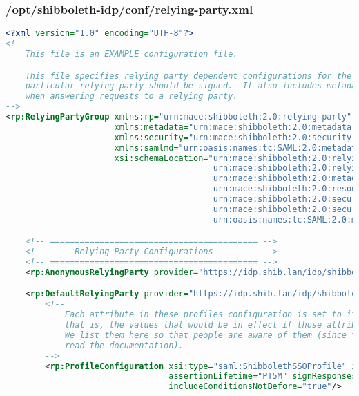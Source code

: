 \subsubsection{/opt/shibboleth-idp/conf/relying-party.xml}
\begin{lstlisting}[language=xml]
<?xml version="1.0" encoding="UTF-8"?>
<!--
    This file is an EXAMPLE configuration file.

    This file specifies relying party dependent configurations for the IdP, for example, whether SAML assertions to a
    particular relying party should be signed.  It also includes metadata provider and credential definitions used
    when answering requests to a relying party.
-->
<rp:RelyingPartyGroup xmlns:rp="urn:mace:shibboleth:2.0:relying-party" xmlns:saml="urn:mace:shibboleth:2.0:relying-party:saml"
                      xmlns:metadata="urn:mace:shibboleth:2.0:metadata" xmlns:resource="urn:mace:shibboleth:2.0:resource"
                      xmlns:security="urn:mace:shibboleth:2.0:security" xmlns:samlsec="urn:mace:shibboleth:2.0:security:saml"
                      xmlns:samlmd="urn:oasis:names:tc:SAML:2.0:metadata" xmlns:xsi="http://www.w3.org/2001/XMLSchema-instance"
                      xsi:schemaLocation="urn:mace:shibboleth:2.0:relying-party classpath:/schema/shibboleth-2.0-relying-party.xsd
                                          urn:mace:shibboleth:2.0:relying-party:saml classpath:/schema/shibboleth-2.0-relying-party-saml.xsd
                                          urn:mace:shibboleth:2.0:metadata classpath:/schema/shibboleth-2.0-metadata.xsd
                                          urn:mace:shibboleth:2.0:resource classpath:/schema/shibboleth-2.0-resource.xsd
                                          urn:mace:shibboleth:2.0:security classpath:/schema/shibboleth-2.0-security.xsd
                                          urn:mace:shibboleth:2.0:security:saml classpath:/schema/shibboleth-2.0-security-policy-saml.xsd
                                          urn:oasis:names:tc:SAML:2.0:metadata classpath:/schema/saml-schema-metadata-2.0.xsd">

    <!-- ========================================== -->
    <!--      Relying Party Configurations          -->
    <!-- ========================================== -->
    <rp:AnonymousRelyingParty provider="https://idp.shib.lan/idp/shibboleth" defaultSigningCredentialRef="IdPCredential"/>

    <rp:DefaultRelyingParty provider="https://idp.shib.lan/idp/shibboleth" defaultSigningCredentialRef="IdPCredential">
        <!--
            Each attribute in these profiles configuration is set to its default value,
            that is, the values that would be in effect if those attributes were not present.
            We list them here so that people are aware of them (since they seem reluctant to
            read the documentation).
        -->
        <rp:ProfileConfiguration xsi:type="saml:ShibbolethSSOProfile" includeAttributeStatement="false"
                                 assertionLifetime="PT5M" signResponses="conditional" signAssertions="never"
                                 includeConditionsNotBefore="true"/>


\end{lstlisting}
